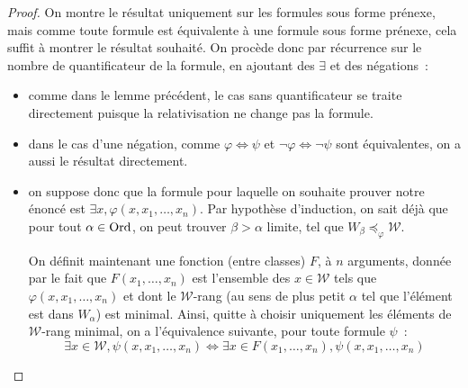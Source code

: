 \begin{proof}
  On montre le résultat uniquement sur les formules sous forme prénexe, mais
  comme toute formule est équivalente à une formule sous forme prénexe, cela
  suffit à montrer le résultat souhaité. On procède donc par récurrence sur
  le nombre de quantificateur de la formule, en ajoutant des $\exists$ et des
  négations~:
  \begin{itemize}
  \item comme dans le lemme précédent, le cas sans quantificateur se traite
    directement puisque la relativisation ne change pas la formule.
  \item dans le cas d'une négation, comme $\varphi \iff \psi$ et
    $\lnot\varphi\iff\lnot\psi$ sont équivalentes, on a aussi le résultat
    directement.
  \item on suppose donc que la formule pour laquelle on souhaite prouver notre
    énoncé est $\exists x, \varphi(x,x_1,\ldots,x_n)$. Par hypothèse
    d'induction, on sait déjà que pour tout $\alpha \in \operatorname{Ord}$, on peut trouver
    $\beta > \alpha$ limite, tel que
    $W_\beta \preccurlyeq_{\varphi} \mathcal W$.

    On définit maintenant une fonction (entre classes) $F$, à $n$ arguments,
    donnée par le fait que $F(x_1,\ldots,x_n)$ est l'ensemble des
    $x \in \mathcal W$ tels que $\varphi(x,x_1,\ldots,x_n)$ et dont le
    $\mathcal W$-rang (au sens de plus petit $\alpha$ tel que l'élément est dans
    $W_\alpha$) est minimal. Ainsi, quitte à choisir uniquement les éléments de
    $\mathcal W$-rang minimal, on a l'équivalence suivante, pour toute formule
    $\psi$~:
    \[\exists x \in \mathcal W, \psi(x,x_1,\ldots,x_n) \iff
    \exists x \in F(x_1,\ldots,x_n), \psi(x,x_1,\ldots,x_n)\]


\end{itemize}
\end{proof}
